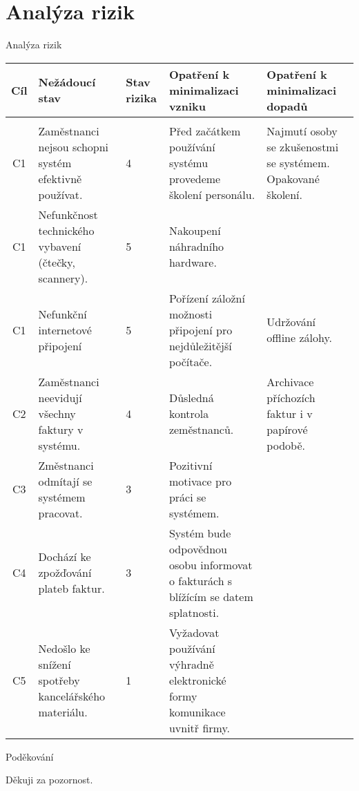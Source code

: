 \documentclass[10pt]{beamer}
\begin{document}
\section{Analýza rizik}
\begin{frame}{Analýza rizik}
\scriptsize 
\begin{tabular}{| c | p{7em} | p{2em} |  p{10em} | p{10em}|}
\hline
  Cíl & \raggedright Nežádoucí stav  &  Stav rizika & Opatření k minimalizaci vzniku &  Opatření k minimalizaci dopadů \\  \hline & & & & \\[-1em] \hline
  
 C1 & \tiny Zaměstnanci nejsou schopni systém efektivně používat. & 4 & \tiny Před začátkem používání systému provedeme školení personálu. & \tiny Najmutí osoby se zkušenostmi se systémem. Opakované školení. \\ \hline
 C1  & \tiny Nefunkčnost technického vybavení (čtečky, scannery). & 5 & \tiny Nakoupení náhradního hardware. & \tiny  \\ \hline
 C1  & \tiny Nefunkční internetové připojení  & 5 & \tiny Pořízení záložní možnosti připojení pro nejdůležitější počítače. & \tiny Udržování offline zálohy. \\ \hline
 C2  & \tiny Zaměstnanci neevidují všechny faktury v systému. & 4 & \tiny Důsledná kontrola zeměstnanců. & \tiny Archivace příchozích faktur i v papírové podobě. \\ \hline
 C3  & \tiny Změstnanci odmítají se systémem pracovat. & 3 & \tiny Pozitivní motivace pro práci se systémem. & \tiny  \\ \hline
 C4  & \tiny Dochází ke zpožďování plateb faktur. & 3 & \tiny Systém bude odpovědnou osobu informovat o fakturách s blížícím se datem splatnosti. & \tiny  \\ \hline
 C5  & \tiny Nedošlo ke snížení spotřeby kancelářského materiálu. & 1 & \tiny Vyžadovat používání výhradně elektronické formy komunikace uvnitř firmy. & \tiny \\ \hline

\end{tabular}
\end{frame}

\begin{frame}{Poděkování}
	\begin{block}{Děkuji za pozornost.}
	\end{block}
\end{frame}
\end{document}
